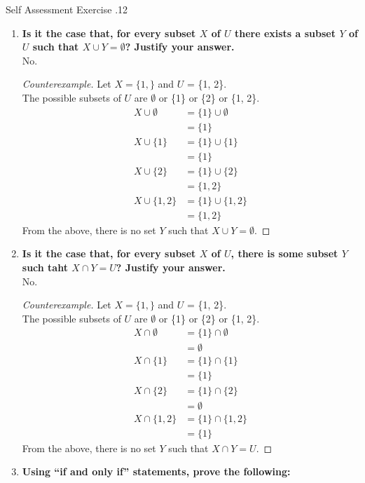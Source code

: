 \documentclass[../notes.tex]{subfiles}
\begin{document}
\begin{exercise}{Self Assessment Exercise \thechapter.12}
\begin{enumerate}
					\pagebreak
					\item \textbf{Is it the case that, for every subset $X$ of $U$ there exists a subset $Y$ of $U$ such that $X \cup Y = \emptyset$? Justify your answer.}\\
						No.
						\begin{proof}[Counterexample]
							Let $X = \{1,\}$ and $U$ = \{1, 2\}.\\
							The possible subsets of $U$ are $\emptyset$ or \{1\} or \{2\} or \{1, 2\}.
							\begin{align*}
								X \cup \emptyset &= \{1\} \cup \emptyset\\
								&= \{1\}\\
								X \cup \{1\} &= \{1\} \cup \{1\}\\
								&= \{1\}\\
								X \cup \{2\} &= \{1\} \cup \{2\}\\
								&= \{1, 2\}\\
								X \cup \{1, 2\} &= \{1\} \cup \{1, 2\}\\
								&= \{1, 2\}
							\end{align*}
							From the above, there is no set $Y$ such that $X \cup Y = \emptyset$.
						\end{proof}
					\item \textbf{Is it the case that, for every subset $X$ of $U$, there is some subset $Y$ such taht $X \cap Y = U$? Justify your answer.}\\
						No.
						\begin{proof}[Counterexample]
							Let $X = \{1,\}$ and $U$ = \{1, 2\}.\\
							The possible subsets of $U$ are $\emptyset$ or \{1\} or \{2\} or \{1, 2\}.
							\begin{align*}
								X \cap \emptyset &= \{1\} \cap \emptyset\\
								&= \emptyset\\
								X \cap \{1\} &= \{1\} \cap \{1\}\\
								&= \{1\}\\
								X \cap \{2\} &= \{1\} \cap \{2\}\\
								&= \emptyset\\
								X \cap \{1, 2\} &= \{1\} \cap \{1, 2\}\\
								&= \{1\}
							\end{align*}
							From the above, there is no set $Y$ such that $X \cap Y = U$.
						\end{proof}
					\item \textbf{Using ``if and only if'' statements, prove the following:}

\end{enumerate}
\end{exercise}
\end{document}
